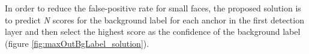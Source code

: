 In order to reduce the false-positive rate for small faces, the proposed solution is to predict \emph{N} scores for the background label for each anchor in the first detection layer and then select the highest score as the confidence of the background label (figure \ref{fig:maxOutBgLabel_solution}).

\begin{figure}[h]
    \centering
    \captionsetup[subfigure]{justification=centering}
    \quad
\end{figure}

